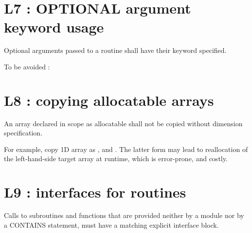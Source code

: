 \documentclass[letterpaper,10pt,english]{sphinxmanual}
\begin{document}
\section{L7 : OPTIONAL argument keyword usage}
\label{\detokenize{rules/L7:l7-optional-argument-keyword-usage}}\label{\detokenize{rules/L7::doc}}
Optional arguments passed to a routine shall have their keyword specified.

To be avoided :
\def\sphinxLiteralBlockLabel{\label{\detokenize{rules/L7:id1}}}
\begin{sphinxVerbatim}[commandchars=\\\{\}]
 


   

            
           
   
\end{sphinxVerbatim}


\section{L8 : copying allocatable arrays}
\label{\detokenize{rules/L8:l8-copying-allocatable-arrays}}\label{\detokenize{rules/L8::doc}}
An array declared in scope as allocatable shall not be copied without dimension specification.

For example, copy 1D array as , and  .
The latter form may lead to reallocation of the left-hand-side target array at runtime, which
is error-prone, and costly.


\section{L9 : interfaces for routines}
\label{\detokenize{rules/L9:l9-interfaces-for-routines}}\label{\detokenize{rules/L9::doc}}
Calls to subroutines and functions that are provided neither by a module nor by a CONTAINS statement,
must have a matching explicit interface block.
\end{document}
